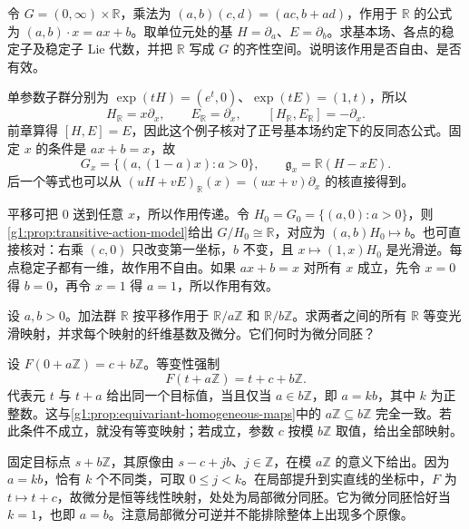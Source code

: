 \begin{exercise}\label{g1:ex:affine-action-fundamental-fields}
	令 \(G=(0,\infty)\times\mathbb R\)，乘法为 \((a,b)(c,d)=(ac,b+ad)\)，作用于 \(\mathbb R\) 的公式为 \((a,b)\cdot x=ax+b\)。取单位元处的基 \(H=\partial_a\)、\(E=\partial_b\)。求基本场、各点的稳定子及稳定子 Lie 代数，并把 \(\mathbb R\) 写成 \(G\) 的齐性空间。说明该作用是否自由、是否有效。
\end{exercise}
\begin{solution}
	单参数子群分别为 \(\exp(tH)=(e^t,0)\)、\(\exp(tE)=(1,t)\)，所以
	\[
		H_{\mathbb R}=x\partial_x,\qquad E_{\mathbb R}=\partial_x,
		\qquad [H_{\mathbb R},E_{\mathbb R}]=-\partial_x.
	\]
	前章算得 \([H,E]=E\)，因此这个例子核对了正号基本场约定下的反同态公式。固定 \(x\) 的条件是 \(ax+b=x\)，故
	\[
		G_x=\{(a,(1-a)x):a>0\},\qquad
		\mathfrak g_x=\mathbb R(H-xE).
	\]
	后一个等式也可以从 \((uH+vE)_{\mathbb R}(x)=(ux+v)\partial_x\) 的核直接得到。

	平移可把 \(0\) 送到任意 \(x\)，所以作用传递。令 \(H_0=G_0=\{(a,0):a>0\}\)，则\cref{g1:prop:transitive-action-model}给出 \(G/H_0\cong\mathbb R\)，对应为 \((a,b)H_0\mapsto b\)。也可直接核对：右乘 \((c,0)\) 只改变第一坐标，\(b\) 不变，且 \(x\mapsto(1,x)H_0\) 是光滑逆。每点稳定子都有一维，故作用不自由。如果 \(ax+b=x\) 对所有 \(x\) 成立，先令 \(x=0\) 得 \(b=0\)，再令 \(x=1\) 得 \(a=1\)，所以作用有效。
\end{solution}

\begin{exercise}\label{g1:ex:circle-equivariant-maps}
	设 \(a,b>0\)。加法群 \(\mathbb R\) 按平移作用于 \(\mathbb R/a\mathbb Z\) 和 \(\mathbb R/b\mathbb Z\)。求两者之间的所有 \(\mathbb R\) 等变光滑映射，并求每个映射的纤维基数及微分。它们何时为微分同胚？
\end{exercise}
\begin{solution}
	设 \(F(0+a\mathbb Z)=c+b\mathbb Z\)。等变性强制
	\[
		F(t+a\mathbb Z)=t+c+b\mathbb Z.
	\]
	代表元 \(t\) 与 \(t+a\) 给出同一个目标值，当且仅当 \(a\in b\mathbb Z\)，即 \(a=kb\)，其中 \(k\) 为正整数。这与\cref{g1:prop:equivariant-homogeneous-maps}中的 \(a\mathbb Z\subseteq b\mathbb Z\) 完全一致。若此条件不成立，就没有等变映射；若成立，参数 \(c\) 按模 \(b\mathbb Z\) 取值，给出全部映射。

	固定目标点 \(s+b\mathbb Z\)，其原像由 \(s-c+jb\)、\(j\in\mathbb Z\)，在模 \(a\mathbb Z\) 的意义下给出。因为 \(a=kb\)，恰有 \(k\) 个不同类，可取 \(0\le j<k\)。在局部提升到实直线的坐标中，\(F\) 为 \(t\mapsto t+c\)，故微分是恒等线性映射，处处为局部微分同胚。它为微分同胚恰好当 \(k=1\)，也即 \(a=b\)。注意局部微分可逆并不能排除整体上出现多个原像。
\end{solution}

